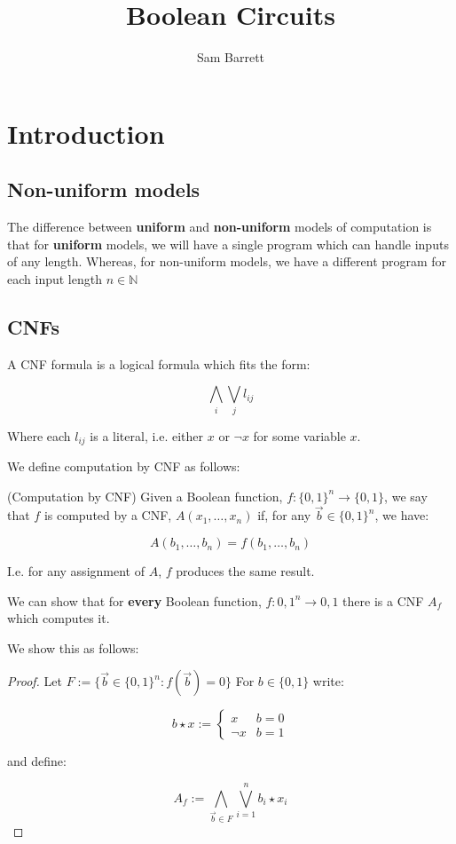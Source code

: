\documentclass{report}
\title{Boolean Circuits}
\author{Sam Barrett}
\newcommand{\N}{\mathbb{N}}
\begin{document}
\section{Introduction}

\subsection{Non-uniform models}

The difference between \textbf{uniform} and \textbf{non-uniform} models of computation is that for \textbf{uniform} models, we will have a single program which can handle inputs of any length. Whereas, for non-uniform models, we have a different program for each input length $n \in \N$

\subsection{CNFs}

A CNF formula is a logical formula which fits the form:

\[
  \bigwedge_{i}\bigvee_{j} l_{ij}
\]

Where each $l_{ij}$ is a literal, i.e. either $x$ or $\neg x$ for some variable $x$.

We define computation by CNF as follows:

\begin{definition}(Computation by CNF)
  Given a Boolean function, $f : \{ 0,1 \}^{n} \rightarrow \{ 0,1 \} $, we say that $f$ is computed by a CNF, $A(x_{1},\ldots,x_n) $ if, for any $\vec{b} \in \{ 0,1 \} ^{n}$, we have:

  \[
    A(b_{1},\ldots,b_{n}) = f(b_{1},\ldots,b_{n})
  \]
\end{definition}

I.e. for any assignment of $A$, $f$ produces the same result.
\begin{theorem}
We can show that for \textbf{every} Boolean function, $f : { 0,1 }^{n} \rightarrow { 0,1 } $ there is a CNF $A_{f}$ which computes it.
\end{theorem}

We show this as follows:

\begin{proof}
Let $F := \{ \vec{b}\in \{ 0,1 \} ^{n} : f(\vec{b}) = 0\} $ For $b \in \{ 0,1 \} $ write:

\[
  b \star x := \begin{cases}
    x  & b=0\\
    \neg x & b=1
  \end{cases}
\]

and define:

\[
  A_{f} := \bigwedge_{\vec{b}\in F}\bigvee_{i=1}^{n} b_{i} \star x_{i}
\]
\end{proof}
\end{document}
